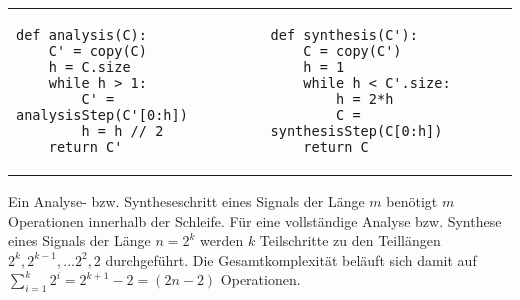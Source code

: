 \begin{adjustbox}{max width=\textwidth ,center}
\begin{tabular}{p{}|p{}}
\begin{verbatim}
def analysis(C):
    C' = copy(C)
    h = C.size
    while h > 1:
        C' = analysisStep(C'[0:h])
        h = h // 2
    return C'
\end{verbatim}
&
\begin{verbatim}
def synthesis(C'):
    C = copy(C')
    h = 1
    while h < C'.size:
        h = 2*h
        C = synthesisStep(C[0:h])
    return C
\end{verbatim}
\\
\end{tabular}
\end{adjustbox}

\noindent Ein Analyse- bzw. Syntheseschritt eines Signals der Länge $m$ benötigt $m$ Operationen innerhalb der Schleife. Für eine vollständige Analyse bzw. Synthese eines Signals der Länge $n=2^k$ werden $k$ Teilschritte zu den Teillängen $2^k, 2^{k-1}, ... 2^2, 2$ durchgeführt. Die Gesamtkomplexität beläuft sich damit auf $\sum_{i=1}^k 2^i = 2^{k+1}-2 = (2n-2)$ Operationen.
%
